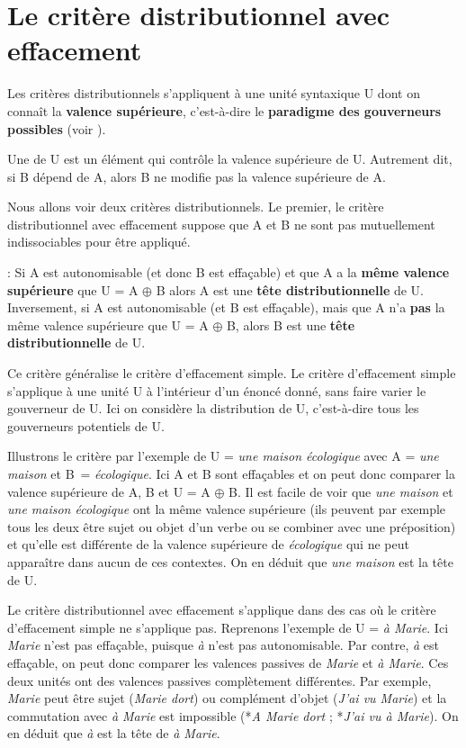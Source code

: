 \section{Le critère distributionnel avec effacement}\label{sec:3.3.11}

Les critères distributionnels s’appliquent à une unité syntaxique U dont on connaît la \textbf{valence supérieure}, c’est-à-dire le \textbf{paradigme des gouverneurs possibles} (voir ).

{Une  de U est un élément qui contrôle la valence supérieure de U. Autrement dit, si B dépend de A, alors B ne modifie pas la valence supérieure de A.}

Nous allons voir deux critères distributionnels. Le premier, le critère distributionnel avec effacement suppose que A et B ne sont pas mutuellement indissociables pour être appliqué.

{: Si A est autonomisable (et donc B est effaçable) et que A a la \textbf{même valence supérieure} que U = A ${\oplus}$ B alors A est une \textbf{tête distributionnelle} de U. Inversement, si A est autonomisable (et B est effaçable), mais que A n’a \textbf{pas} la même valence supérieure que U = A ${\oplus}$ B, alors B est une \textbf{tête distributionnelle} de U.}

Ce critère généralise le critère d’effacement simple. Le critère d’effacement simple s’applique à une unité U à l’intérieur d’un énoncé donné, sans faire varier le gouverneur de U. Ici on considère la distribution de U, c’est-à-dire tous les gouverneurs potentiels de U.

Illustrons le critère par l’exemple de U = \textit{une maison écologique} avec A = \textit{une maison} et B~= \textit{écologique}. Ici A et B sont effaçables et on peut donc comparer la valence supérieure de A, B et U = A ${\oplus}$ B. Il est facile de voir que \textit{une maison} et \textit{une maison écologique} ont la même valence supérieure (ils peuvent par exemple tous les deux être sujet ou objet d’un verbe ou se combiner avec une préposition) et qu’elle est différente de la valence supérieure de \textit{écologique} qui ne peut apparaître dans aucun de ces contextes. On en déduit que \textit{une maison} est la tête de U.

Le critère distributionnel avec effacement s’applique dans des cas où le critère d’effacement simple ne s’applique pas. Reprenons l’exemple de U = \textit{à Marie}. Ici \textit{Marie} n’est pas effaçable, puisque \textit{à} n’est pas autonomisable. Par contre, \textit{à} est effaçable, on peut donc comparer les valences passives de \textit{Marie} et \textit{à Marie}. Ces deux unités ont des valences passives complètement différentes. Par exemple, \textit{Marie} peut être sujet (\textit{Marie dort}) ou complément d’objet (\textit{J’ai vu Marie}) et la commutation avec \textit{à Marie} est impossible (*\textit{A Marie dort} ; *\textit{J’ai vu à Marie}). On en déduit que \textit{à} est la tête de \textit{à Marie}.

